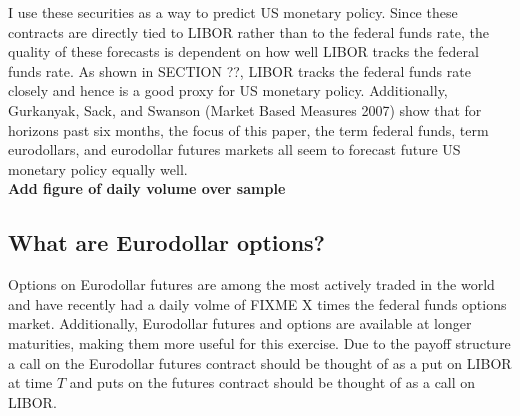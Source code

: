 \documentclass[11pt]{article}
\begin{document}
I use these securities as a way to predict US monetary policy. Since these contracts are directly tied to LIBOR rather than to the federal funds rate, the quality of these forecasts is dependent on how well LIBOR tracks the federal funds rate. As shown in SECTION ??, LIBOR tracks the federal funds rate closely and hence is a good proxy for US monetary policy. Additionally, Gurkanyak, Sack, and Swanson (Market Based Measures 2007) show that for horizons past six months, the focus of this paper, the term federal funds, term eurodollars, and eurodollar futures markets all seem to forecast future US monetary policy equally well.  \\
{\color{red}\textbf{Add figure of daily volume over sample}}\\



\subsection{What are Eurodollar options? }
 Options on Eurodollar futures are among the most actively traded in the world and have recently had a daily volme of FIXME X times the federal funds options market. Additionally, Eurodollar futures and options are available at longer maturities, making them more useful for this exercise. Due to the payoff structure a call on the Eurodollar futures contract should be thought of as a put on LIBOR at time $T$ and puts on the futures contract should be thought of as a call on LIBOR. \\


 
%
%
%
\end{document}
